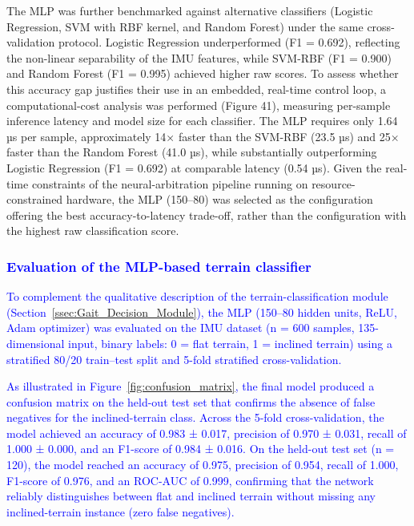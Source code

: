 \documentclass[preprint,12pt]{elsarticle}
\newcommand{\revblue}[1]{\textcolor{blue}{#1}}
\begin{document}
The MLP was further benchmarked against alternative classifiers (Logistic Regression, SVM with RBF kernel, and Random Forest) under the same cross-validation protocol. Logistic Regression underperformed (F1 = 0.692), reflecting the non-linear separability of the IMU features, while SVM-RBF (F1 = 0.900) and Random Forest (F1 = 0.995) achieved higher raw scores. To assess whether this accuracy gap justifies their use in an embedded, real-time control loop, a computational-cost analysis was performed (Figure 41), measuring per-sample inference latency and model size for each classifier. The MLP requires only 1.64 µs per sample, approximately 14× faster than the SVM-RBF (23.5 µs) and 25× faster than the Random Forest (41.0 µs), while substantially outperforming Logistic Regression (F1 = 0.692) at comparable latency (0.54 µs). Given the real-time constraints of the neural-arbitration pipeline running on resource-constrained hardware, the MLP (150–80) was selected as the configuration offering the best accuracy-to-latency trade-off, rather than the configuration with the highest raw classification score.

\subsubsection{\revblue{Evaluation of the MLP-based terrain classifier}}

\revblue{To complement the qualitative description of the terrain-classification module (Section~\ref{ssec:Gait_Decision_Module}), the MLP (150–80 hidden units, ReLU, Adam optimizer) was evaluated on the IMU dataset (n = 600 samples, 135-dimensional input, binary labels: 0 = flat terrain, 1 = inclined terrain) using a stratified 80/20 train–test split and 5-fold stratified cross-validation.}

\revblue{As illustrated in Figure~\ref{fig:confusion_matrix}, the final model produced a confusion matrix on the held-out test set that confirms the absence of false negatives for the inclined-terrain class. Across the 5-fold cross-validation, the model achieved an accuracy of 0.983 ± 0.017, precision of 0.970 ± 0.031, recall of 1.000 ± 0.000, and an F1-score of 0.984 ± 0.016. On the held-out test set (n = 120), the model reached an accuracy of 0.975, precision of 0.954, recall of 1.000, F1-score of 0.976, and an ROC-AUC of 0.999, confirming that the network reliably distinguishes between flat and inclined terrain without missing any inclined-terrain instance (zero false negatives).}
\end{document}

